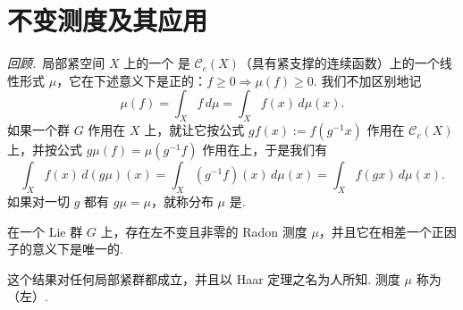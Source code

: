 \section{不变测度及其应用}\label{sec:lie-1-10}

\emph{回顾.}\ 局部紧空间 $X$ 上的一个  是 $\mathcal C_c(X)$（具有紧支撑的连续函数）上的一个线性形式 $\mu$，它在下述意义下是正的：$f\geqslant 0\Rightarrow\mu(f)\geqslant 0$. 我们不加区别地记
\[
\mu(f)=\int_X f\,d\mu=\int_X f(x)\,d\mu(x).
\]
如果一个群 $G$ 作用在 $X$ 上，就让它按公式 $gf(x):=f(g^{-1}x)$ 作用在 $\mathcal C_c(X)$ 上，并按公式 $g\mu(f)=\mu(g^{-1}f)$ 作用在上，于是我们有
\[
\int_X f(x)\,d(g\mu)(x)=\int_X(g^{-1}f)(x)\,d\mu(x)=\int_X f(gx)\,d\mu(x).
\]
如果对一切 $g$ 都有 $g\mu=\mu$，就称分布 $\mu$ 是.

\begin{theorem}\label{thm:lie-1-10-1}
在一个 Lie 群 $G$ 上，存在左不变且非零的 Radon 测度 $\mu$，并且它在相差一个正因子的意义下是唯一的.
\end{theorem}

\begin{remark*}
这个结果对任何局部紧群都成立，并且以 Haar 定理之名为人所知. 测度 $\mu$ 称为（左）.
\end{remark*}


